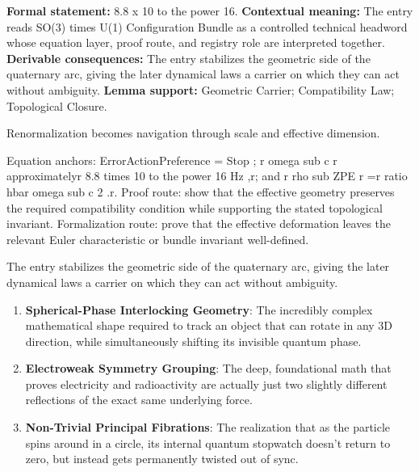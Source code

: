 \begingroup\footnotesize\setlength{\emergencystretch}{3em}\sloppy
\textbf{Formal statement:} 8.8 x 10 to the power 16. \textbf{Contextual meaning:} The entry reads SO(3) times U(1) Configuration Bundle as a controlled technical headword whose equation layer, proof route, and registry role are interpreted together. \textbf{Derivable consequences:} The entry stabilizes the geometric side of the quaternary arc, giving the later dynamical laws a carrier on which they can act without ambiguity. \textbf{Lemma support:} Geometric Carrier; Compatibility Law; Topological Closure.\par
\endgroup

Renormalization becomes navigation through scale and effective dimension.

Equation anchors: ErrorActionPreference = Stop ; r omega sub c r approximatelyr 8.8 times 10 to the power 16 Hz ,r; and r rho sub ZPE r =r ratio hbar omega sub c 2 .r. Proof route: show that the effective geometry preserves the required compatibility condition while supporting the stated topological invariant. Formalization route: prove that the effective deformation leaves the relevant Euler characteristic or bundle invariant well-defined.

The entry stabilizes the geometric side of the quaternary arc, giving the later dynamical laws a carrier on which they can act without ambiguity.
\endgroup

\begin{enumerate}[leftmargin=1.6em,itemsep=6pt,topsep=4pt]
\item \textbf{Spherical-Phase Interlocking Geometry}: The incredibly complex mathematical shape required to track an object that can rotate in any 3D direction, while simultaneously shifting its invisible quantum phase.
\item \textbf{Electroweak Symmetry Grouping}: The deep, foundational math that proves electricity and radioactivity are actually just two slightly different reflections of the exact same underlying force.
\item \textbf{Non-Trivial Principal Fibrations}: The realization that as the particle spins around in a circle, its internal quantum stopwatch doesn't return to zero, but instead gets permanently twisted out of sync.
\end{enumerate}

